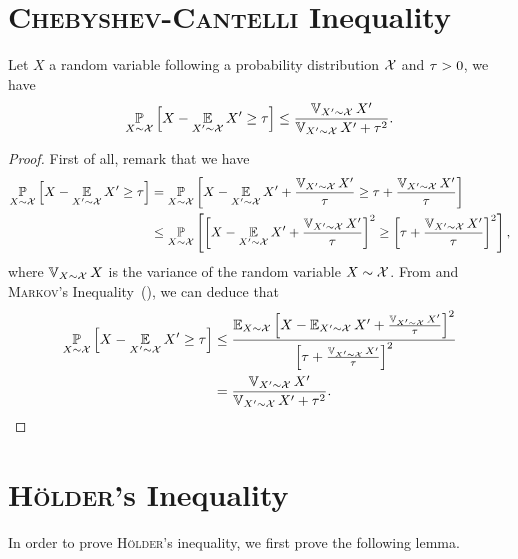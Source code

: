 \section{\textsc{Chebyshev}-\textsc{Cantelli} Inequality}

\begin{theorem}Let $X$ a random variable  following a probability distribution $\mathcal{X}$ and $\tau>0$, we have
\begin{align*}
    \operatorname*{\mathbb{P}}_{X\sim\mathcal{X}}\left[ X-\operatorname*{\mathbb{E}}_{X'\sim\mathcal{X}}X' \ge \tau\right] \le \frac{\operatorname*{\mathbb{V}}_{X'\sim\mathcal{X}}X'}{\operatorname*{\mathbb{V}}_{X'\sim\mathcal{X}}X'+\tau^2}.
\end{align*}
\label{ap:tools:theorem:cantelli}
\end{theorem}
\begin{noaddcontents}\begin{proof}
First of all, remark that we have
\begin{align}
    \operatorname*{\mathbb{P}}_{X\sim\mathcal{X}}\left[ X-\operatorname*{\mathbb{E}}_{X'\sim\mathcal{X}}X' \ge \tau\right] &= \operatorname*{\mathbb{P}}_{X\sim\mathcal{X}}\left[ X-\operatorname*{\mathbb{E}}_{X'\sim\mathcal{X}}X' + \frac{\operatorname*{\mathbb{V}}_{X'\sim\mathcal{X}}X'}{\tau} \ge \tau + \frac{\operatorname*{\mathbb{V}}_{X'\sim\mathcal{X}}X'}{\tau}\right]\nonumber\\
    &\le \operatorname*{\mathbb{P}}_{X\sim\mathcal{X}}\left[ \left[ X-\operatorname*{\mathbb{E}}_{X'\sim\mathcal{X}}X' + \frac{\operatorname*{\mathbb{V}}_{X'\sim\mathcal{X}}X'}{\tau}\right]^2 \ge \left[\tau + \frac{\operatorname*{\mathbb{V}}_{X'\sim\mathcal{X}}X'}{\tau}\right]^2\right],\label{ap:tools:eq:proof-cantelli}
\end{align}
where $\operatorname*{\mathbb{V}}_{X\sim\mathcal{X}}X$ is the variance of the random variable $X\sim\mathcal{X}$.
From  and \textsc{Markov}'s Inequality~(), we can deduce that 
\begin{align*}
    \operatorname*{\mathbb{P}}_{X\sim\mathcal{X}}\left[ X-\operatorname*{\mathbb{E}}_{X'\sim\mathcal{X}}X' \ge \tau\right] &\le \frac{\operatorname*{\mathbb{E}}_{X\sim\mathcal{X}}\left[ X - {\textstyle\operatorname*{\mathbb{E}}_{X'\sim\mathcal{X}}X'} + \frac{\operatorname*{\mathbb{V}}_{X'\sim\mathcal{X}}X'}{\tau}\right]^2}{\left[\tau + \frac{\operatorname*{\mathbb{V}}_{X'\sim\mathcal{X}}X'}{\tau}\right]^2}\\
    &= \frac{\operatorname*{\mathbb{V}}_{X'\sim\mathcal{X}}X'}{\operatorname*{\mathbb{V}}_{X'\sim\mathcal{X}}X'+\tau^2}.
\end{align*}
\end{proof}\end{noaddcontents}


\section{\textsc{Hölder}'s Inequality}

In order to prove \textsc{Hölder}'s inequality, we first prove the following lemma.

